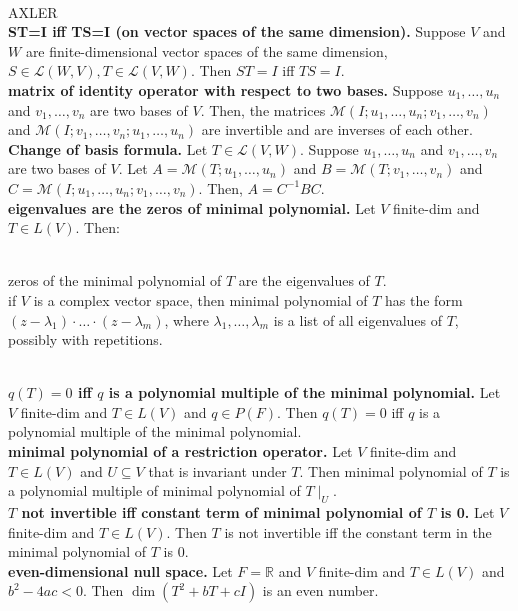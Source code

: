 

	\\ AXLER
	\\ \textbf{ST=I iff TS=I (on vector spaces of the same dimension). } Suppose $V$ and $W$ are finite-dimensional vector spaces of the same dimension, $S \in \mathscr{L}(W,V), T \in \mathscr{L}(V,W)$. Then $ST=I$ iff $TS=I$. 
	\\ \textbf{matrix of identity operator with respect to two bases. } Suppose $u_1,\dots,u_n$ and $v_1,\dots,v_n$ are two bases of $V$. Then, the matrices $\mathscr{M}(I; u_1,\dots,u_n; v_1,\dots,v_n)$ and $\mathscr{M}(I; v_1,\dots,v_n; u_1,\dots,u_n)$ are invertible and are inverses of each other. 
	\\ \textbf{Change of basis formula. } Let $T \in \mathscr{L}(V,W)$. Suppose $u_1,\dots,u_n$ and $v_1,\dots,v_n$ are two bases of $V$. Let $A = \mathscr{M}(T; u_1,\dots,u_n)$ and $B = \mathscr{M}(T; v_1,\dots,v_n)$ and $C = \mathscr{M}(I; u_1,\dots,u_n; v_1,\dots,v_n)$. Then, $A = C^{-1}BC$. 
	\\ \textbf{eigenvalues are the zeros of minimal polynomial. } Let $V$ finite-dim and $T \in L(V)$. Then: 
	\begin{enumerate}
		\\ zeros of the minimal polynomial of $T$ are the eigenvalues of $T$. 
		\\ if $V$ is a complex vector space, then minimal polynomial of $T$ has the form $(z-\lambda_1) \cdot \dots \cdot (z-\lambda_m)$, where $\lambda_1,\dots,\lambda_m$ is a list of all eigenvalues of $T$, possibly with repetitions. 
	\end{enumerate}
	\\ \textbf{$q(T)=0$ iff $q$ is a polynomial multiple of the minimal polynomial. } Let $V$ finite-dim and $T \in L(V)$ and $q \in P(F)$. Then $q(T)=0$ iff $q$ is a polynomial multiple of the minimal polynomial. 
	\\ \textbf{minimal polynomial of a restriction operator. } Let $V$ finite-dim and $T \in L(V)$ and $U \subseteq V$ that is invariant under $T$. Then minimal polynomial of $T$ is a polynomial multiple of minimal polynomial of $T \mid_U$. 
	\\ \textbf{$T$ not invertible iff constant term of minimal polynomial of $T$ is 0. } Let $V$ finite-dim and $T \in L(V)$. Then $T$ is not invertible iff the constant term in the minimal polynomial of $T$ is 0. 
	\\ \textbf{even-dimensional null space. } Let $F = \mathbb{R}$ and $V$ finite-dim and $T \in L(V)$ and $b^2-4ac < 0$. Then $\dim(T^2 + bT + cI)$ is an even number. 
